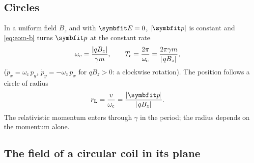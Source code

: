 \documentclass{leveldoc}
\begin{document}
\subsection{Circles}\label{sec:circle}

In a uniform field $B_z$ and with $\vect{E} = 0$, $\abs{\vect{p}}$ is constant and
\eqref{eq:eom-b} turns $\vect{p}$ at the constant rate
\begin{equation}\label{eq:cyclotron}
  \omega_\mathrm{c} = \frac{\left\lvert q B_z\right\rvert}{\gamma m}, \qquad
  T_\mathrm{c} = \frac{2\pi}{\omega_\mathrm{c}} = \frac{2\pi\gamma m}{\left\lvert qB_z\right\rvert} ,
\end{equation}
($\dot p_x = \omega_\mathrm{c}\,p_y$, $\dot p_y = -\omega_\mathrm{c}\,p_x$ for $qB_z > 0$: a
clockwise rotation). The position follows a circle of radius
\begin{equation}\label{eq:larmor-radius}
  r_\mathrm{L} = \frac{v}{\omega_\mathrm{c}} = \frac{\abs{\vect{p}}}{\abs{q B_z}} .
\end{equation}
The relativistic momentum enters through $\gamma$ in the period; the radius depends on the
momentum alone.

\subsection{The field of a circular coil in its plane}\label{sec:loop}
\end{document}
